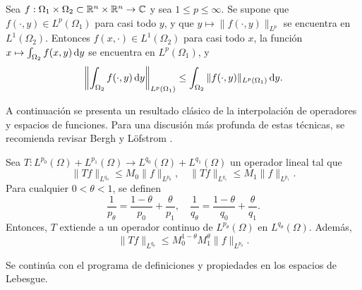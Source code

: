 \begin{proposition}\label{prop:monotonia-Lp}
    Sea $f:\Omega_1 \times \Omega_2 \subset\mathbb{R}^n\times\mathbb{R}^n\rightarrow\mathbb{C}$ y 
    sea $1\leq p\leq\infty$.
    Se supone que $f(\cdot,y)\in L^p(\Omega_1)$ para casi
    todo $y$, y que $y\mapsto \|f(\cdot, y)\|_{L^p}$ se encuentra en
    $L^1(\Omega_2)$. Entonces $f(x, \cdot)\in L^1(\Omega_2)$ para casi
    todo $x$, la función $x\mapsto \int_{\Omega_2} f(x, y)\mathop{}\!\mathrm{d} y$ se encuentra
    en $L^p(\Omega_1)$, y
    \begin{equation*}
        \left\| \int_{\Omega_2} f(\cdot, y)\mathop{}\!\mathrm{d} y
        \right\|_{L^p(\Omega_1)} \leq \int_{\Omega_2} 
        \|f(\cdot, y)\|_{L^p(\Omega_1)} \mathop{}\!\mathrm{d} y.
    \end{equation*}
\end{proposition}
A continuación se presenta un resultado clásico de la interpolación de 
operadores y espacios de
funciones. Para una discusión más profunda de estas técnicas, se recomienda 
revisar Bergh y L\"ofstrom \cite{bergh-lofstrom}.
\begin{theorem}\label{theo:riesz-thorin} 
    Sea $T:L^{p_0}(\Omega)+L^{p_1}(\Omega) \rightarrow 
    L^{q_0}(\Omega)+L^{q_1}(\Omega)$ un operador lineal tal que 
    \begin{equation*}
        \|Tf\|_{L^{q_0}} \leq M_0 \|f\|_{L^{p_0}}, \quad
        \|Tf\|_{L^{q_1}} \leq M_1 \|f\|_{L^{p_1}}.
    \end{equation*}
    Para cualquier $0<\theta<1$, se definen 
    \begin{equation*}
        \frac{1}{p_\theta} = \frac{1-\theta}{p_0} + \frac{\theta}{p_1}, 
        \quad 
        \frac{1}{q_\theta} = \frac{1-\theta}{q_0} + \frac{\theta}{q_1}.
    \end{equation*}
    Entonces, $T$ extiende a un operador continuo de $L^{p_\theta}(\Omega)$
    en $L^{q_\theta}(\Omega)$. Además, 
    \begin{equation*}
        \|Tf\|_{L^{q_\theta}} \leq M_0^{1-\theta}M_1^\theta \|f\|_{L^{p_\theta}}.
    \end{equation*}
\end{theorem}
Se continúa con el programa de definiciones y propiedades en los espacios 
de Lebesgue.

